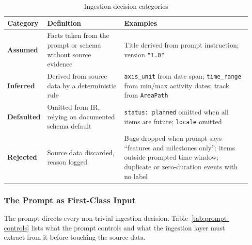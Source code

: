 \begin{table}[h]
\centering
\small
\begin{tabular}{lp{4.5cm}p{6cm}}
\toprule
\textbf{Category} & \textbf{Definition} & \textbf{Examples} \\
\midrule
\textbf{Assumed} & Facts taken from the prompt or schema without source evidence & Title derived from prompt instruction; version \texttt{"1.0"} \\
\addlinespace
\textbf{Inferred} & Derived from source data by a deterministic rule & \texttt{axis\_unit} from date span; \texttt{time\_range} from min/max activity dates; track from \texttt{AreaPath} \\
\addlinespace
\textbf{Defaulted} & Omitted from IR, relying on documented schema default & \texttt{status: planned} omitted when all items are future; \texttt{locale} omitted \\
\addlinespace
\textbf{Rejected} & Source data discarded, reason logged & Bugs dropped when prompt says ``features and milestones only''; items outside prompted time window; duplicate or zero-duration events with no label \\
\bottomrule
\end{tabular}
\caption{Ingestion decision categories}
\label{tab:ingestion-contract}
\end{table}

\subsubsection{The Prompt as First-Class Input}
\label{sec:prompt-as-input}

The prompt directs every non-trivial ingestion decision. Table~\ref{tab:prompt-controls}
lists what the prompt controls and what the ingestion layer must extract from it before
touching the source data.

